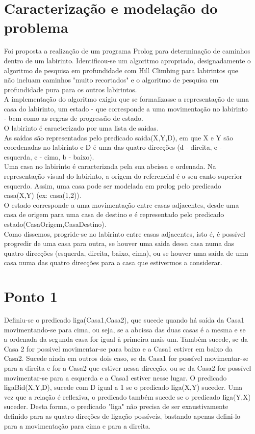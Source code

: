 \documentclass[11pt]{report}
\begin{document}
\section{Caracterização e modelação do problema}
Foi proposta a realização de um programa Prolog para determinação de caminhos dentro de um labirinto.
Identificou-se um algoritmo apropriado, designadamente o algoritmo de pesquisa em profundidade com Hill Climbing para labirintos que não incluam caminhos "muito recortados" e o algoritmo de pesquisa em profundidade pura para os outros labirintos.\\
A implementação do algoritmo exigiu que se formalizasse a representação de uma casa do labirinto, um estado - que corresponde a uma movimentação no labirinto - bem como as regras de progressão de estado.\\
O labirinto é caracterizado por uma lista de saídas.\\
As saídas são representadas pelo predicado saida(X,Y,D), em que X e Y são coordenadas no labirinto e D é uma das quatro direcções (d - direita, e - esquerda, c - cima, b - baixo).\\
Uma casa no labirinto é caracterizada pela sua abcissa e ordenada. Na representação visual do labirinto, a origem do referencial é o seu canto superior esquerdo. Assim, uma casa pode ser modelada em prolog pelo predicado casa(X,Y) (ex: casa(1,2)).\\
O estado corresponde a uma movimentação entre casas adjacentes, desde uma casa de origem para uma casa de destino e é representado pelo predicado estado(CasaOrigem,CasaDestino).\\
Como dissemos, progride-se no labirinto entre casas adjacentes, isto é, é possível progredir de uma casa para outra, se houver uma saida dessa casa numa das quatro direcções (esquerda, direita, baixo, cima), ou se houver uma saída de uma casa numa das quatro direcções para a casa que estivermos a considerar.\\


\section{Ponto 1}
	Definiu-se o predicado liga(Casa1,Casa2), que sucede quando há saída da Casa1 movimentando-se para cima, ou seja, se a abcissa das duas casas é a mesma e se a ordenada da segunda casa for igual à primeira mais um. Também sucede, se da Casa 2 for possivel movimentar-se para baixo e a Casa1 estiver em baixo da Casa2. Sucede ainda em outros dois caso, se da Casa1 for possível movimentar-se para a direita e for a Casa2 que estiver nessa direcção, ou se da Casa2 for possível movimentar-se para a esquerda e a Casa1 estiver nesse lugar. O predicado ligaBid(X,Y,D), sucede com D igual a 1 se o predicado liga(X,Y) suceder. Uma vez que a relação é reflexiva, o predicado também sucede se o predicado liga(Y,X) suceder. Desta forma, o predicado "liga" não precisa de ser exaustivamente definido para as quatro direções de ligação possíveis, bastando apenas defini-lo para a movimentação para cima e para a direita.
\end{document}
